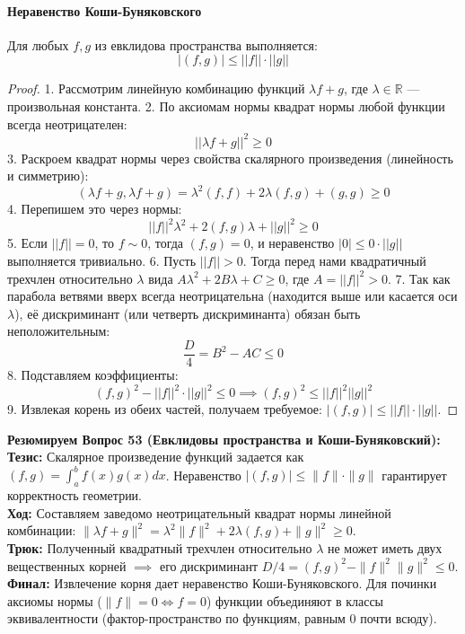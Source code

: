 \paragraph{Неравенство Коши-Буняковского}
Для любых $f, g$ из евклидова пространства выполняется:
$$ |(f, g)| \le ||f|| \cdot ||g|| $$

\begin{proof}
1. Рассмотрим линейную комбинацию функций $\lambda f + g$, где $\lambda \in \mathbb{R}$ — произвольная константа.
2. По аксиомам нормы квадрат нормы любой функции всегда неотрицателен:
$$ ||\lambda f + g||^2 \ge 0 $$
3. Раскроем квадрат нормы через свойства скалярного произведения (линейность и симметрию):
$$ (\lambda f + g, \lambda f + g) = \lambda^2(f, f) + 2\lambda(f, g) + (g, g) \ge 0 $$
4. Перепишем это через нормы:
$$ ||f||^2 \lambda^2 + 2(f, g)\lambda + ||g||^2 \ge 0 $$
5. Если $||f|| = 0$, то $f \sim 0$, тогда $(f, g) = 0$, и неравенство $|0| \le 0 \cdot ||g||$ выполняется тривиально. 
6. Пусть $||f|| > 0$. Тогда перед нами квадратичный трехчлен относительно $\lambda$ вида $A\lambda^2 + 2B\lambda + C \ge 0$, где $A = ||f||^2 > 0$.
7. Так как парабола ветвями вверх всегда неотрицательна (находится выше или касается оси $\lambda$), её дискриминант (или четверть дискриминанта) обязан быть неположительным:
$$ \frac{D}{4} = B^2 - AC \le 0 $$
8. Подставляем коэффициенты:
$$ (f, g)^2 - ||f||^2 \cdot ||g||^2 \le 0 \implies (f, g)^2 \le ||f||^2 ||g||^2 $$
9. Извлекая корень из обеих частей, получаем требуемое: $|(f, g)| \le ||f|| \cdot ||g||$.
\end{proof}

\begin{tcolorbox}[colback=gray!5, colframe=black, boxrule=0.5pt, arc=0pt]
\textbf{Резюмируем Вопрос 53 (Евклидовы пространства и Коши-Буняковский):} \\
\textbf{Тезис:} Скалярное произведение функций задается как $(f,g) = \int_a^b f(x)g(x)dx$. Неравенство $|(f,g)| \le \|f\| \cdot \|g\|$ гарантирует корректность геометрии. \\
\textbf{Ход:} Составляем заведомо неотрицательный квадрат нормы линейной комбинации: $\|\lambda f + g\|^2 = \lambda^2 \|f\|^2 + 2\lambda (f,g) + \|g\|^2 \ge 0$. \\
\textbf{Трюк:} Полученный квадратный трехчлен относительно $\lambda$ не может иметь двух вещественных корней $\implies$ его дискриминант $D/4 = (f,g)^2 - \|f\|^2\|g\|^2 \le 0$. \\
\textbf{Финал:} Извлечение корня дает неравенство Коши-Буняковского. Для починки аксиомы нормы ($\|f\|=0 \iff f=0$) функции объединяют в классы эквивалентности (фактор-пространство по функциям, равным 0 почти всюду).
\end{tcolorbox}


